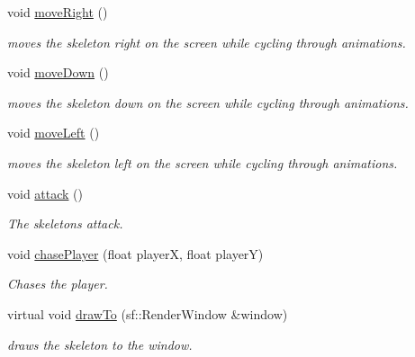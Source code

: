 \begin{DoxyCompactItemize}
void \mbox{\hyperlink{classSkeleton_a3d8ce7b8a1d10e4a33a27f0eee54042e}{move\+Right}} ()
\begin{DoxyCompactList}\small\item\em moves the skeleton right on the screen while cycling through animations. \end{DoxyCompactList}\item 
\mbox{\label{classSkeleton_aee2055fa3d1db80392b365aa40c878bf}} 
void \mbox{\hyperlink{classSkeleton_aee2055fa3d1db80392b365aa40c878bf}{move\+Down}} ()
\begin{DoxyCompactList}\small\item\em moves the skeleton down on the screen while cycling through animations. \end{DoxyCompactList}\item 
\mbox{\label{classSkeleton_ab03c65cdabc94f280443691653112d3a}} 
void \mbox{\hyperlink{classSkeleton_ab03c65cdabc94f280443691653112d3a}{move\+Left}} ()
\begin{DoxyCompactList}\small\item\em moves the skeleton left on the screen while cycling through animations. \end{DoxyCompactList}\item 
void \mbox{\hyperlink{classSkeleton_a90927f96174510cebe29d6bb39f4387c}{attack}} ()
\begin{DoxyCompactList}\small\item\em The skeletons attack. \end{DoxyCompactList}\item 
void \mbox{\hyperlink{classSkeleton_aefa4683beb507bafaa2b20eaba4f478d}{chase\+Player}} (float playerX, float playerY)
\begin{DoxyCompactList}\small\item\em Chases the player. \end{DoxyCompactList}\item 
\mbox{\label{classSkeleton_aa39ac09590a5274536dc2fc125cc62e6}} 
virtual void \mbox{\hyperlink{classSkeleton_aa39ac09590a5274536dc2fc125cc62e6}{draw\+To}} (sf\+::\+Render\+Window \&window)
\begin{DoxyCompactList}\small\item\em draws the skeleton to the window. \end{DoxyCompactList}\item 

\end{DoxyCompactItemize}
